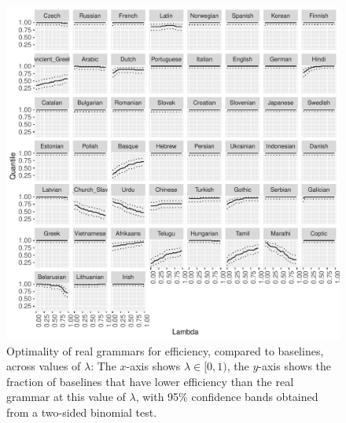\documentclass[10pt,twoside,lineno]{article}
\begin{document}
%


\begin{figure}
\centering
\includegraphics[width=\textwidth]{../results/plane/analyze_pareto_optimality/figures/quantileByLambda.pdf}
	\caption[]{Optimality of real grammars for efficiency, compared to baselines, across values of $\lambda$: The $x$-axis shows $\lambda \in [0,1)$, the $y$-axis shows the fraction of baselines that have lower efficiency than the real grammar at this value of $\lambda$, with 95\% confidence bands obtained from a two-sided binomial test.}\label{fig:lambda-quantile}
\end{figure}
\end{document}
